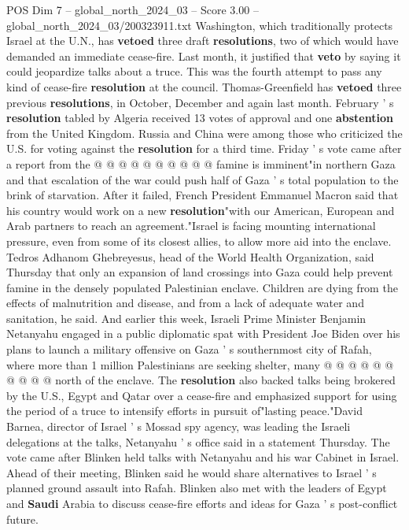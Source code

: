 \begin{textsample}{POS Dim 7 – global\_north\_2024\_03 – Score 3.00 – global\_north\_2024\_03/200323911.txt}
Washington, which traditionally protects Israel at the U.N., has \textbf{vetoed} three draft \textbf{resolutions}, two of which would have demanded an immediate cease-fire.
Last month, it justified that \textbf{veto} by saying it could jeopardize talks about a truce.
This was the fourth attempt to pass any kind of cease-fire \textbf{resolution} at the council.
Thomas-Greenfield has \textbf{vetoed} three previous \textbf{resolutions}, in October, December and again last month.
February ' s \textbf{resolution} tabled by Algeria received 13 votes of approval and one \textbf{abstention} from the United Kingdom.
Russia and China were among those who criticized the U.S. for voting against the \textbf{resolution} for a third time.
Friday ' s vote came after a report from the @ @ @ @ @ @ @ @ @ @ famine is imminent"in northern Gaza and that escalation of the war could push half of Gaza ' s total population to the brink of starvation.
After it failed, French President Emmanuel Macron said that his country would work on a new \textbf{resolution}"with our American, European and Arab partners to reach an agreement."Israel is facing mounting international pressure, even from some of its closest allies, to allow more aid into the enclave.
Tedros Adhanom Ghebreyesus, head of the World Health Organization, said Thursday that only an expansion of land crossings into Gaza could help prevent famine in the densely populated Palestinian enclave.
Children are dying from the effects of malnutrition and disease, and from a lack of adequate water and sanitation, he said.
And earlier this week, Israeli Prime Minister Benjamin Netanyahu engaged in a public diplomatic spat with President Joe Biden over his plans to launch a military offensive on Gaza ' s southernmost city of Rafah, where more than 1 million Palestinians are seeking shelter, many @ @ @ @ @ @ @ @ @ @ north of the enclave.
The \textbf{resolution} also backed talks being brokered by the U.S., Egypt and Qatar over a cease-fire and emphasized support for using the period of a truce to intensify efforts in pursuit of"lasting peace."David Barnea, director of Israel ' s Mossad spy agency, was leading the Israeli delegations at the talks, Netanyahu ' s office said in a statement Thursday.
The vote came after Blinken held talks with Netanyahu and his war Cabinet in Israel.
Ahead of their meeting, Blinken said he would share alternatives to Israel ' s planned ground assault into Rafah.
Blinken also met with the leaders of Egypt and \textbf{Saudi} Arabia to discuss cease-fire efforts and ideas for Gaza ' s post-conflict future.

\end{textsample}
